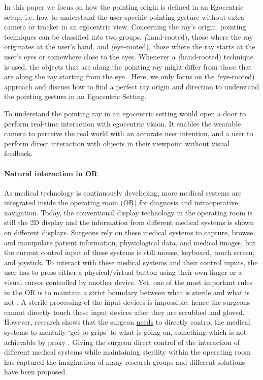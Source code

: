 In this paper we focus on how the pointing origin is defined in an Egocentric setup, i.e. how to understand the user specific pointing gesture without extra camera or tracker in an egocentric view.  
Concerning the ray's origin, pointing techniques can be classified into two groups, \textit(hand-rooted), those where the ray originates at the user's hand, and \textit(eye-rooted), those where the ray starts at the user's eyes or somewhere close to the eyes. Whenever a \textit(hand-rooted) technique is used, the objects that are along the pointing ray might differ from those that are along the ray starting from the eye \citep{Argelaguet2008}. Here, we only focus on the \textit(eye-rooted) approach and discuss how to find a perfect ray origin and direction to understand the pointing gesture in an Egocentric Setting. 

To understand the pointing ray in an egocentric setting would open a door to perform real-time interaction with egocentric vision.
It enables the wearable camera to perceive the real world with an accurate user intention, and a user to perform direct interaction with objects in their viewpoint without visual feedback.
\paragraph{Natural interaction in OR}
As medical technology is continuously developing, more medical systems are integrated inside the operating room (OR) for diagnosis and intraoperative navigation. Today, the conventional display technology in the operating room is still the 2D display and the information from different medical systems is shown on different displays. Surgeons rely on these medical systems to capture, browse, and manipulate patient information, physiological data, and medical images, but the current control input of these systems is still mouse, keyboard, touch screen, and joystick. To interact with these medical systems and their control inputs, the user has to press either a physical/virtual button using their own finger or a visual cursor controlled by another device.
Yet, one of the most important rules in the OR is to maintain a strict boundary between what is sterile and what is not \cite{OHara2014a}. A sterile processing of the input devices is impossible; hence the surgeons cannot directly touch these input devices after they are scrubbed and gloved. However, research shows that the surgeon \underline{needs} to directly control the medical systems to mentally `get to grips' to what is going on, something which is not achievable by proxy \cite{Johnson2011a}. Giving the surgeon direct control of the interaction of different medical systems while maintaining sterility within the operating room has captured the imagination of many research groups and different solutions have been proposed.

